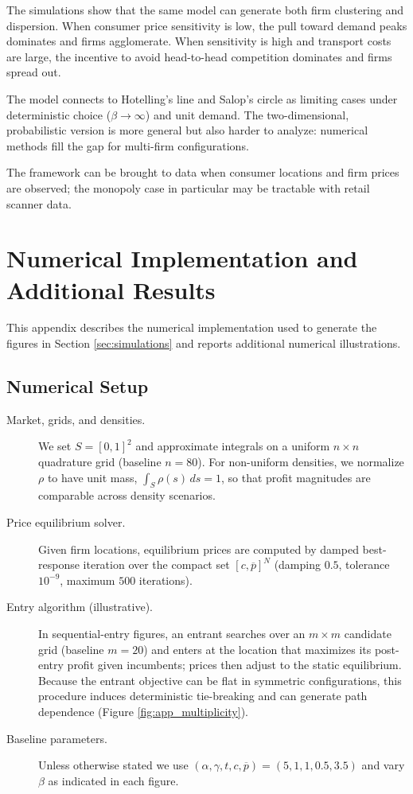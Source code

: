 \documentclass{article}
\begin{document}
The simulations show that the same model can generate both firm clustering and dispersion. When consumer price sensitivity is low, the pull toward demand peaks dominates and firms agglomerate. When sensitivity is high and transport costs are large, the incentive to avoid head-to-head competition dominates and firms spread out.

The model connects to Hotelling's line and Salop's circle as limiting cases under deterministic choice ($\beta \to \infty$) and unit demand. The two-dimensional, probabilistic version is more general but also harder to analyze: numerical methods fill the gap for multi-firm configurations.

The framework can be brought to data when consumer locations and firm prices are observed; the monopoly case in particular may be tractable with retail scanner data.

\newpage
\appendix

\section{Numerical Implementation and Additional Results}
\label{app:numerics}

This appendix describes the numerical implementation used to generate the figures in Section \ref{sec:simulations} and reports additional numerical illustrations.

\subsection{Numerical Setup}
\begin{description}
  \item[Market, grids, and densities.] We set $S=[0,1]^2$ and approximate integrals on a uniform $n\times n$ quadrature grid (baseline $n=80$). For non-uniform densities, we normalize $\rho$ to have unit mass, $\int_S \rho(s)\,ds = 1$, so that profit magnitudes are comparable across density scenarios.

  \item[Price equilibrium solver.] Given firm locations, equilibrium prices are computed by damped best-response iteration over the compact set $[c,\overline{p}]^N$ (damping $0.5$, tolerance $10^{-9}$, maximum $500$ iterations).

  \item[Entry algorithm (illustrative).] In sequential-entry figures, an entrant searches over an $m\times m$ candidate grid (baseline $m=20$) and enters at the location that maximizes its post-entry profit given incumbents; prices then adjust to the static equilibrium. Because the entrant objective can be flat in symmetric configurations, this procedure induces deterministic tie-breaking and can generate path dependence (Figure \ref{fig:app_multiplicity}).

  \item[Baseline parameters.] Unless otherwise stated we use $(\alpha,\gamma,t,c,\overline{p})=(5,1,1,0.5,3.5)$ and vary $\beta$ as indicated in each figure.
\end{description}
\end{document}
